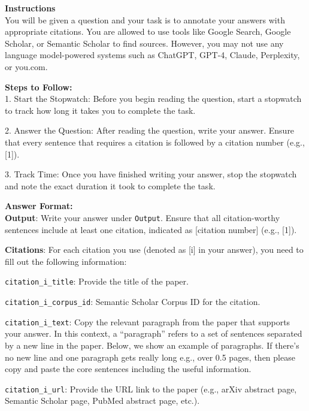 \documentclass{article} %
\begin{document}
\begin{table}[h!]
\begin{tcolorbox}
{\bf Instructions}\\ 
You will be given a question and your task is to annotate your answers with appropriate citations. You are allowed to use tools like Google Search, Google Scholar, or Semantic Scholar to find sources. However, you may not use any language model-powered systems such as ChatGPT, GPT-4, Claude, Perplexity, or you.com.

{\bf Steps to Follow:}\\
1. Start the Stopwatch: Before you begin reading the question, start a stopwatch to track how long it takes you to complete the task.


2. Answer the Question: After reading the question, write your answer. Ensure that every sentence that requires a citation is followed by a citation number (e.g., [1]).


3. Track Time: Once you have finished writing your answer, stop the stopwatch and note the exact duration it took to complete the task.


{\bf Answer Format:}\\
{\bf Output}: Write your answer under \texttt{Output}. Ensure that all citation-worthy sentences include at least one citation, indicated as [citation number] (e.g., [1]).

{\bf Citations}: For each citation you use (denoted as [i] in your answer), you need to fill out the following information:

\texttt{citation\_i\_title}:  
Provide the title of the paper.

\texttt{citation\_i\_corpus\_id}: Semantic Scholar Corpus ID for the citation.   

\texttt{citation\_i\_text}: Copy the relevant paragraph from the paper that supports your answer. In this context, a ``paragraph'' refers to a set of sentences separated by a new line in the paper. Below, we show an example of paragraphs. If there’s no new line and one paragraph gets really long e.g., over 0.5 pages, then please copy and paste the core sentences including the useful information.

\texttt{citation\_i\_url}: Provide the URL link to the paper (e.g., arXiv abstract page, Semantic Scholar page, PubMed abstract page, etc.).
\end{tcolorbox}
\caption{\label{tab:answer_annotation_instructions} {\bf \textsc{ScholarQAMulti} annotation instructions}: Instructions given to our expert annotators to annotate question and answers. }
\end{table}
\end{document}
